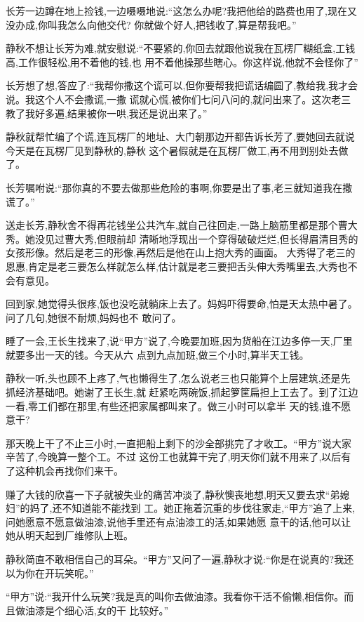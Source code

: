 ﻿\documentclass[12pt]{article}
\begin{document}
长芳一边蹲在地上捡钱,一边嗫嗫地说:``这怎么办呢?我把他给的路费也用了,现在又没办成,你叫我怎么向他交代?
你就做个好人,把钱收了,算是帮我吧。''

静秋不想让长芳为难,就安慰说:``不要紧的,你回去就跟他说我在瓦楞厂糊纸盒,工钱高,工作很轻松,用不着他的钱,也
用不着他操那些\myrule 瞎心。你这样说,他就不会怪你了\myrule ''

长芳想了想,答应了:``我帮你撒这个谎可以,但你要帮我把谎话编圆了,教给我,我才会说。我这个人不会撒谎,一撒
谎就心慌,被你们七问八问的,就问出来了。这次老三教了我好多遍,结果被你一哄,我还是说出来了。''

静秋就帮忙编了个谎,连瓦楞厂的地址、大门朝那边开都告诉长芳了,要她回去就说今天是在瓦楞厂见到静秋的,静秋
这个暑假就是在瓦楞厂做工,再不用到别处去做了。

长芳嘱咐说:``那你真的不要去做那些危险的事啊,你要是出了事,老三就知道我在撒谎了。''

送走长芳,静秋舍不得再花钱坐公共汽车,就自己往回走,一路上脑筋里都是那个曹大秀。她没见过曹大秀,但眼前却
清晰地浮现出一个穿得破破烂烂,但长得眉清目秀的女孩形像。然后是老三的形像,再然后是他在山上抱大秀的画面。
大秀得了老三的恩惠,肯定是老三要怎么样就怎么样,估计就是老三要把舌头伸大秀嘴里去,大秀也不会有意见。

回到家,她觉得头很疼,饭也没吃就躺床上去了。妈妈吓得要命,怕是天太热中暑了。问了几句,她很不耐烦,妈妈也不
敢问了。

睡了一会,王长生找来了,说``甲方''说了,今晚要加班,因为货船在江边多停一天,厂里就要多出一天的钱。今天从六
点到九点加班,做三个小时,算半天工钱。

静秋一听,头也顾不上疼了,气也懒得生了,怎么说老三也只能算个上层建筑,还是先抓经济基础吧。她谢了王长生,就
赶紧吃两碗饭,抓起箩筐扁担上工去了。到了江边一看,零工们都在那里,有些还把家属都叫来了。做三小时可以拿半
天的钱,谁不愿意干?

那天晚上干了不止三小时,一直把船上剩下的沙全部挑完了才收工。``甲方''说大家辛苦了,今晚算一整个工。不过
这份工也就算干完了,明天你们就不用来了,以后有了这种机会再找你们来干。

赚了大钱的欣喜一下子就被失业的痛苦冲淡了,静秋懊丧地想,明天又要去求``弟媳妇''的妈了,还不知道能不能找到
工。她正拖着沉重的步伐往家走,``甲方''追了上来,问她愿意不愿意做油漆,说他手里还有点油漆工的活,如果她愿
意干的话,他可以让她从明天起到厂维修队上班。

静秋简直不敢相信自己的耳朵。``甲方''又问了一遍,静秋才说:``你是在说真的?我还以为你在开玩笑呢。''

``甲方''说:``我开什么玩笑?我是真的叫你去做油漆。我看你干活不偷懒,相信你。而且做油漆是个细心活,女的干
比较好。''
\end{document}
